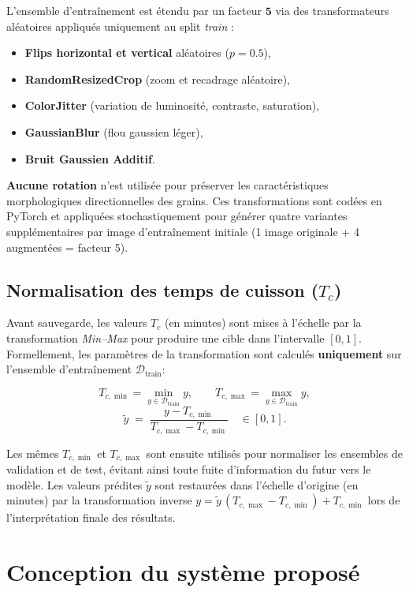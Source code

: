 L'ensemble d'entraînement est étendu par un facteur $\mathbf{5}$ via des transformateurs aléatoires appliqués uniquement au split \emph{train} :
\begin{itemize}
    \item \textbf{Flips horizontal et vertical} aléatoires ($p=0.5$),
    \item \textbf{RandomResizedCrop} (zoom et recadrage aléatoire),
    \item \textbf{ColorJitter} (variation de luminosité, contraste, saturation),
    \item \textbf{GaussianBlur} (flou gaussien léger),
    \item \textbf{Bruit Gaussien Additif}.
\end{itemize}
\textbf{Aucune rotation} n'est utilisée pour préserver les caractéristiques morphologiques directionnelles des grains. Ces transformations sont codées en PyTorch et appliquées stochastiquement pour générer quatre variantes supplémentaires par image d'entraînement initiale (1 image originale + 4 augmentées = facteur 5).

\subsection{Normalisation des temps de cuisson ($T_c$)}

Avant sauvegarde, les valeurs $T_c$ (en minutes) sont mises à l'échelle par la transformation \emph{Min–Max} pour produire une cible dans l'intervalle $[0,1]$. Formellement, les paramètres de la transformation sont calculés \textbf{uniquement} sur l'ensemble d'entraînement $\mathcal{D}_{\text{train}}$:

\[
T_{c,\min} = \min_{y\in \mathcal{D}_{\text{train}}} y, \qquad
T_{c,\max} = \max_{y\in \mathcal{D}_{\text{train}}} y,
\]
\[
\tilde{y} \;=\; \frac{y - T_{c,\min}}{T_{c,\max} - T_{c,\min}} \quad\in[0,1].
\]

Les mêmes $T_{c,\min}$ et $T_{c,\max}$ sont ensuite utilisés pour normaliser les ensembles de validation et de test, évitant ainsi toute fuite d'information du futur vers le modèle. Les valeurs prédites $\tilde{y}$ sont restaurées dans l'échelle d'origine (en minutes) par la transformation inverse $y = \tilde{y}\,(T_{c,\max}-T_{c,\min}) + T_{c,\min}$ lors de l'interprétation finale des résultats.

\section{Conception du système proposé}

